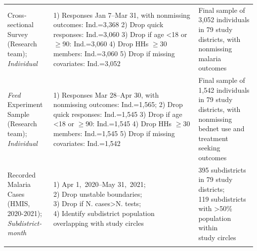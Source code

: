 {\begin{tabular}{p{3.6cm} p{6.8cm} p{6.8cm}}
\makecell[l]{Cross‐sectional \\ Survey\\(Research team);\\\emph{Individual}}
  & \makecell[l]{1) Responses Jan 7--Mar 31,  \\ with nonmissing outcomes:  Ind.=3,368 \\
                 2) Drop quick responses\sym{**}: Ind.=3,060 \\
                 3) Drop if age <18 or $\geq$90: Ind.=3,060 \\
                 4) Drop HHs $\geq$30 members: Ind.=3,060 \\
                 5) Drop if missing covariates:  Ind.=3,052}
  & \makecell[l]{Final sample of 3,052 individuals  in 79 study \\ districts, with nonmissing malaria outcomes} \\
\addlinespace \hline \addlinespace

\makecell[l]{\textit{Feed} Experiment \\ Sample\\(Research team);\\\emph{Individual}}
  & \makecell[l]{1) Responses Mar 28--Apr 30, \\ with  nonmissing outcomes:  Ind.=1,565; \\
                 2) Drop quick responses\sym{**}: Ind.=1,545 \\
                 3) Drop if age <18 or $\geq$90: Ind.=1,545 \\
                 4) Drop HHs $\geq$30 members: Ind.=1,545 \\
                 5) Drop if missing covariates:  Ind.=1,542}
  & \makecell[l]{Final sample of 1,542 individuals  in 79 study \\ districts, with nonmissing bednet use and \\ treatment seeking outcomes} \\
\addlinespace \hline \addlinespace

\makecell[l]{Recorded Malaria \\Cases \\(HMIS, 2020-2021);\\\emph{Subdistrict-month}}
  & \makecell[l]{1) Apr 1,~2020--May 31,~2021;\\ 2) Drop unstable boundaries;\\ 3) Drop if N. cases>N. tests; \\ 4) Identify subdistrict population\\ overlapping with study circles}
  & \makecell[l]{395 subdistricts in 79 study districts;\\ 119 subdistricts with >50\%  population within \\study circles} \\
\addlinespace \hline \addlinespace


\end{tabular}}

